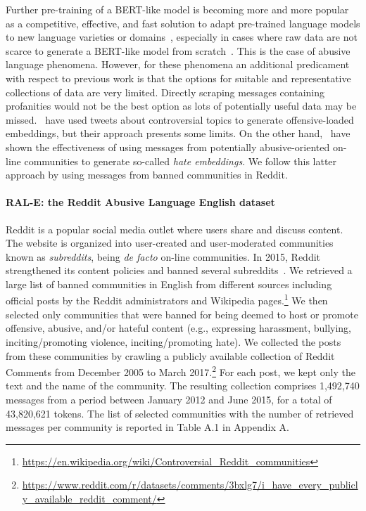 \documentclass[11pt]{article}
\begin{document}
Further pre-training of a BERT-like model is becoming more and more popular as a competitive, effective, and fast solution to adapt pre-trained language models to new language varieties or domains~\cite{barbieri-etal-2020-tweeteval,biobert,finbert,chalkidis-etal-2020-legal}, especially in cases where raw data are not scarce to generate a BERT-like model from scratch~\cite{gururangan-etal-2020-dont}. This is the case of abusive language phenomena. However, for these phenomena an additional predicament with respect to previous work is that the options for suitable and representative collections of data are very limited. Directly scraping messages containing profanities would not be the best option as lots of potentially useful data may be missed.~ have used tweets about controversial topics to generate offensive-loaded embeddings, but their approach presents some limits. On the other hand,~ have shown the effectiveness of using messages from potentially abusive-oriented on-line communities to generate so-called \textit{hate embeddings}. We follow this latter approach by using messages from banned communities in Reddit. 

\paragraph{RAL-E: the Reddit Abusive Language English dataset} Reddit is a popular social media outlet where users share and discuss content. The website is organized into user-created and user-moderated communities known as \textit{subreddits}, being \textit{de facto} on-line communities. In 2015, Reddit strengthened its content policies and banned several subreddits~\cite{chandrasekharan}. We retrieved a large list of banned communities in English from different sources including official posts by the Reddit administrators and Wikipedia pages.\footnote{\url{https://en.wikipedia.org/wiki/Controversial_Reddit_communities}} We then selected only communities that were banned for being deemed to host or promote offensive, abusive, and/or hateful content (e.g., expressing harassment, bullying, inciting/promoting violence, inciting/promoting hate). 
We collected the posts from these communities by crawling a publicly available collection of Reddit Comments from December 2005 to March 2017.\footnote{\url{https://www.reddit.com/r/datasets/comments/3bxlg7/i_have_every_publicly_available_reddit_comment/}} For each post, we kept only the text and the name of the community. The resulting collection comprises 1,492,740 messages from a period between January 2012 and June 2015, for a total of 43,820,621 tokens. The list of selected communities with the number of retrieved messages per community is reported in Table A.1 in Appendix A.
\end{document}
